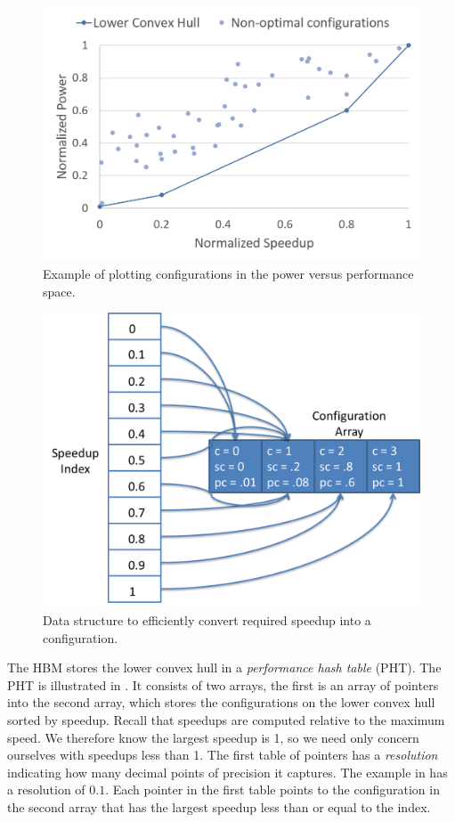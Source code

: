 \begin{figure}
\includegraphics[width=\columnwidth]{figures/TradeoffExample.png}
\caption{Example of plotting configurations in the power versus
  performance space.}
  \label{fig:convexhull}
\end{figure}



\begin{figure}
\includegraphics[width=\columnwidth]{figures/SpeedupHashTable.png}
\caption{Data structure to efficiently convert required speedup into a
  configuration.}
  \label{fig:pht}
\end{figure}

The HBM stores the lower convex hull in a \emph{performance hash
  table} (PHT).  The PHT is illustrated in .  It consists
of two arrays, the first is an array of pointers into the second
array, which stores the configurations on the lower convex hull sorted
by speedup.  Recall that speedups are computed relative to the maximum
speed.  We therefore know the largest speedup is 1, so we need only
concern ourselves with speedups less than 1.  The first table of
pointers has a \emph{resolution} indicating how many decimal points of
precision it captures.  The example in  has a resolution
of $0.1$.  Each pointer in the first table points to the configuration
in the second array that has the largest speedup less than or equal to
the index.

